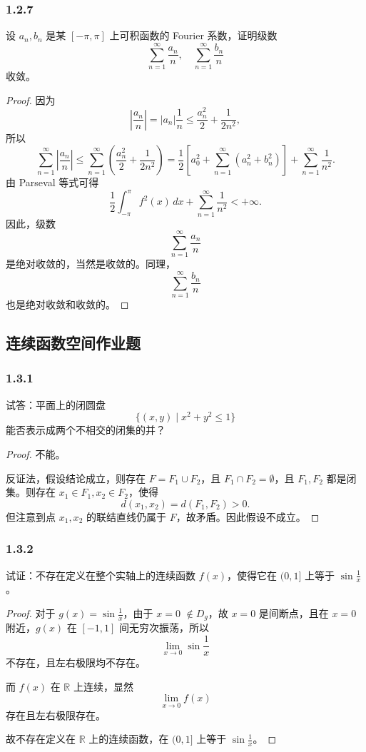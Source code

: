 \documentclass[12pt]{ctexart}
\begin{document}
\subsubsection*{1.2.7}
设 $a_n, b_n$ 是某 $[-\pi, \pi]$ 上可积函数的 Fourier 系数，证明级数
\[
\sum_{n=1}^\infty \frac{a_n}{n}, \quad \sum_{n=1}^\infty \frac{b_n}{n}
\]
收敛。

\begin{proof}
因为
\[
\left| \frac{a_n}{n} \right| = \left| a_n \right| \frac{1}{n} \leq \frac{a_n^2}{2} + \frac{1}{2n^2},
\]
所以
\[
\sum_{n=1}^\infty \left| \frac{a_n}{n} \right| \leq \sum_{n=1}^\infty \left(\frac{a_n^2}{2} + \frac{1}{2n^2}\right) 
= \frac{1}{2} \left[a_0^2 + \sum_{n=1}^\infty \left(a_n^2 + b_n^2\right)\right] + \sum_{n=1}^\infty \frac{1}{n^2}.
\]
由 Parseval 等式可得
\[
\frac{1}{2} \int_{-\pi}^\pi f^2(x) \, dx + \sum_{n=1}^\infty \frac{1}{n^2} < +\infty.
\]
因此，级数
\[
\sum_{n=1}^\infty \frac{a_n}{n}
\]
是绝对收敛的，当然是收敛的。同理，
\[
\sum_{n=1}^\infty \frac{b_n}{n}
\]
也是绝对收敛和收敛的。
\end{proof}

\subsection{连续函数空间作业题}

\subsubsection*{1.3.1}
试答：平面上的闭圆盘
\[
\{(x, y) \mid x^2 + y^2 \leq 1\}
\]
能否表示成两个不相交的闭集的并？
\begin{proof}
不能。

反证法，假设结论成立，则存在 $F = F_1 \cup F_2$，且 $F_1 \cap F_2 = \emptyset$，且 $F_1, F_2$ 都是闭集。则存在 $x_1 \in F_1, x_2 \in F_2$，使得
\[
d(x_1, x_2) = d(F_1, F_2) > 0.
\]
但注意到点 $x_1, x_2$ 的联结直线仍属于 $F$，故矛盾。因此假设不成立。
\end{proof}

\subsubsection*{1.3.2}
试证：不存在定义在整个实轴上的连续函数 $f(x)$，使得它在 $(0, 1]$ 上等于 $\sin \frac{1}{x}$。

\begin{proof}
对于 $g(x) = \sin \frac{1}{x}$，由于 $x=0$ $\notin D_g$，故 $x=0$ 是间断点，且在 $x=0$ 附近，$g(x)$ 在 $[-1, 1]$ 间无穷次振荡，所以
\[
\lim_{x \to 0} \sin \frac{1}{x}
\]
不存在，且左右极限均不存在。

而 $f(x)$ 在 $\mathbb{R}$ 上连续，显然
\[
\lim_{x \to 0} f(x)
\]
存在且左右极限存在。

故不存在定义在 $\mathbb{R}$ 上的连续函数，在 $(0, 1]$ 上等于 $\sin \frac{1}{x}$。
\end{proof}
\end{document}
